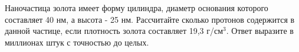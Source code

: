 
Наночастица
золота имеет форму цилиндра, диаметр основания которого составляет  40 нм, а высота - 25 нм. 
Рассчитайте сколько протонов содержится в данной частице, если плотность золота составляет 19,3 г/см$^3$.
 Ответ выразите в миллионах штук с точностью до целых.

